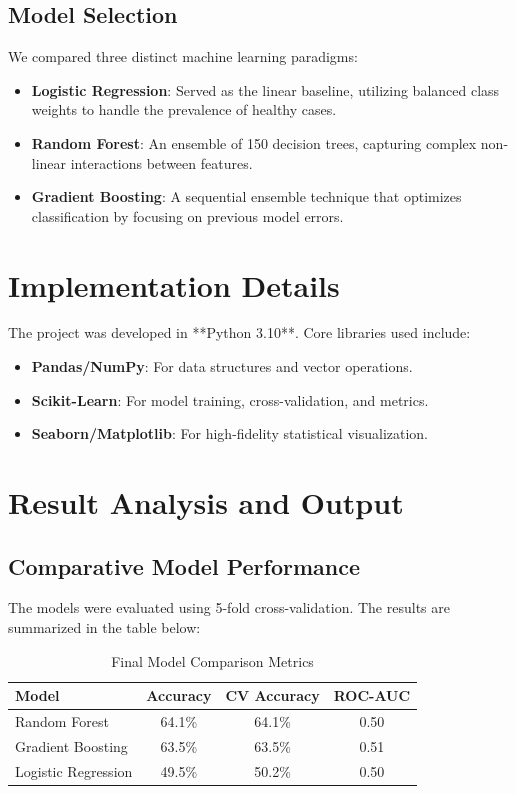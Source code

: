 \documentclass[12pt]{article}
\begin{document}
\subsection{Model Selection}
We compared three distinct machine learning paradigms:
\begin{itemize}
    \item \textbf{Logistic Regression}: Served as the linear baseline, utilizing balanced class weights to handle the prevalence of healthy cases.
    \item \textbf{Random Forest}: An ensemble of 150 decision trees, capturing complex non-linear interactions between features.
    \item \textbf{Gradient Boosting}: A sequential ensemble technique that optimizes classification by focusing on previous model errors.
\end{itemize}

\section{Implementation Details}
The project was developed in **Python 3.10**. Core libraries used include:
\begin{itemize}
    \item \textbf{Pandas/NumPy}: For data structures and vector operations.
    \item \textbf{Scikit-Learn}: For model training, cross-validation, and metrics.
    \item \textbf{Seaborn/Matplotlib}: For high-fidelity statistical visualization.
\end{itemize}

\section{Result Analysis and Output}

\subsection{Comparative Model Performance}
The models were evaluated using 5-fold cross-validation. The results are summarized in the table below:

\begin{table}[H]
    \centering
    \caption{Final Model Comparison Metrics}
    \begin{tabular}{lccc}
        \toprule
        \textbf{Model} & \textbf{Accuracy} & \textbf{CV Accuracy} & \textbf{ROC-AUC} \\
        \midrule
        Random Forest & 64.1\% & 64.1\% & 0.50 \\
        Gradient Boosting & 63.5\% & 63.5\% & 0.51 \\
        Logistic Regression & 49.5\% & 50.2\% & 0.50 \\
        \bottomrule
    \end{tabular}
\end{table}
\end{document}

